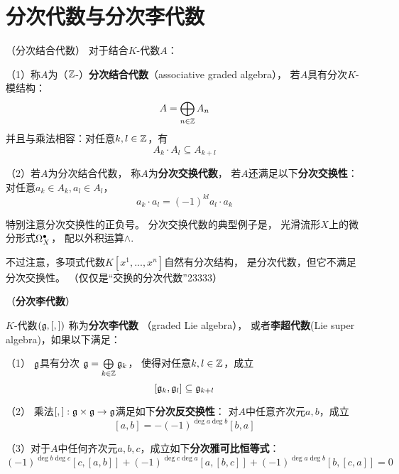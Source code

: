 \section{分次代数与分次李代数}

\begin{definition}（分次结合代数）
对于结合$K$-代数$A$：
\label{分次结合代数-def}

（1）称$A$为（$\mathbb{Z}$-）\textbf{分次结合代数}（associative graded algebra），
若$A$具有分次$K$-模结构：
$$A=\bigoplus_{n\in\mathbb{Z}}A_n$$
并且与乘法相容：对任意$k,l\in\mathbb{Z}$，有
$$A_k\cdot A_l\subseteq A_{k+l}$$

（2）若$A$为分次结合代数，
称$A$为\textbf{分次交换代数}，
若$A$还满足以下\textbf{分次交换性}：
对任意$a_k\in A_k,a_l\in A_l$，
$$a_k\cdot a_l=(-1)^{kl}a_l\cdot a_k$$

\end{definition}

特别注意分次交换性的正负号。
分次交换代数的典型例子是，
光滑流形$X$上的微分形式$\Omega^{\bullet}_X$，
配以外积运算$\wedge$.

不过注意，多项式代数$K[x^1,...,x^n]$自然有分次结构，
是分次代数，但它不满足分次交换性。
{\color{blue}（仅仅是“交换的分次代数”23333）}

\begin{definition}（\textbf{分次李代数}）

$K$-代数$(\mathfrak{g},[,])$ 称为\textbf{分次李代数}
（graded Lie algebra），
或者\textbf{李超代数}(Lie super algebra)，如果以下满足：

（1） $\mathfrak{g}$具有分次
$\mathfrak{g}=\bigoplus\limits_{k\in\mathbb{Z}}\mathfrak{g}_k$，
使得对任意$k,l\in\mathbb{Z}$，成立
$$[\mathfrak{g}_k,\mathfrak{g}_l]\subseteq\mathfrak{g}_{k+l}$$

（2） 乘法$[,]:\mathfrak{g}\times\mathfrak{g}\to\mathfrak{g}$满足如下\textbf{分次反交换性}：
对$A$中任意齐次元$a,b$，成立
$$[a,b]=-(-1)^{\deg a\deg b}[b,a]$$

（3）对于$A$中任何齐次元$a,b,c$，成立如下\textbf{分次雅可比恒等式}：
$$(-1)^{\deg b\deg c}[c,[a,b]]
 +(-1)^{\deg c\deg a}[a,[b,c]]
 +(-1)^{\deg a\deg b}[b,[c,a]]=0$$
\end{definition}

